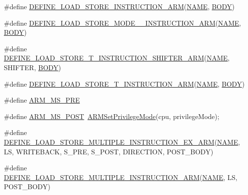 \begin{DoxyCompactItemize}
\item 
\#define \mbox{\hyperlink{isa-arm_8c_a9ed757c169152fcb203fba1b85c7860a}{D\+E\+F\+I\+N\+E\+\_\+\+L\+O\+A\+D\+\_\+\+S\+T\+O\+R\+E\+\_\+\+I\+N\+S\+T\+R\+U\+C\+T\+I\+O\+N\+\_\+\+A\+RM}}(\mbox{\hyperlink{inflate_8h_a164ea0159d5f0b5f12a646f25f99eceaa67bc2ced260a8e43805d2480a785d312}{N\+A\+ME}},  \mbox{\hyperlink{gzlog_8c_aa6bdf6a6d9916c343e1e17774d84a156}{B\+O\+DY}})
\item 
\#define \mbox{\hyperlink{isa-arm_8c_a2ba94fb699e9f4428e6cf1d640f42c2a}{D\+E\+F\+I\+N\+E\+\_\+\+L\+O\+A\+D\+\_\+\+S\+T\+O\+R\+E\+\_\+\+M\+O\+D\+E\+\_\+\_\+\+I\+N\+S\+T\+R\+U\+C\+T\+I\+O\+N\+\_\+\+A\+RM}}(\mbox{\hyperlink{inflate_8h_a164ea0159d5f0b5f12a646f25f99eceaa67bc2ced260a8e43805d2480a785d312}{N\+A\+ME}},  \mbox{\hyperlink{gzlog_8c_aa6bdf6a6d9916c343e1e17774d84a156}{B\+O\+DY}})
\item 
\#define \mbox{\hyperlink{isa-arm_8c_a735d8637e51804e2c8b174f9edc43e04}{D\+E\+F\+I\+N\+E\+\_\+\+L\+O\+A\+D\+\_\+\+S\+T\+O\+R\+E\+\_\+\+T\+\_\+\+I\+N\+S\+T\+R\+U\+C\+T\+I\+O\+N\+\_\+\+S\+H\+I\+F\+T\+E\+R\+\_\+\+A\+RM}}(\mbox{\hyperlink{inflate_8h_a164ea0159d5f0b5f12a646f25f99eceaa67bc2ced260a8e43805d2480a785d312}{N\+A\+ME}},  S\+H\+I\+F\+T\+ER,  \mbox{\hyperlink{gzlog_8c_aa6bdf6a6d9916c343e1e17774d84a156}{B\+O\+DY}})
\item 
\#define \mbox{\hyperlink{isa-arm_8c_ada2566a0e14f1bde045017588e6fe1e7}{D\+E\+F\+I\+N\+E\+\_\+\+L\+O\+A\+D\+\_\+\+S\+T\+O\+R\+E\+\_\+\+T\+\_\+\+I\+N\+S\+T\+R\+U\+C\+T\+I\+O\+N\+\_\+\+A\+RM}}(\mbox{\hyperlink{inflate_8h_a164ea0159d5f0b5f12a646f25f99eceaa67bc2ced260a8e43805d2480a785d312}{N\+A\+ME}},  \mbox{\hyperlink{gzlog_8c_aa6bdf6a6d9916c343e1e17774d84a156}{B\+O\+DY}})
\item 
\#define \mbox{\hyperlink{isa-arm_8c_ab421d83d04b870edf4883223176566b9}{A\+R\+M\+\_\+\+M\+S\+\_\+\+P\+RE}}
\item 
\#define \mbox{\hyperlink{isa-arm_8c_a96d347cafe10b558e730777641cab389}{A\+R\+M\+\_\+\+M\+S\+\_\+\+P\+O\+ST}}~\mbox{\hyperlink{isa-arm_8c_ac85f42234737e9423c66613a87824701}{A\+R\+M\+Set\+Privilege\+Mode}}(cpu, privilege\+Mode);
\item 
\#define \mbox{\hyperlink{isa-arm_8c_a29008e696fccc7169c2f74f616735efe}{D\+E\+F\+I\+N\+E\+\_\+\+L\+O\+A\+D\+\_\+\+S\+T\+O\+R\+E\+\_\+\+M\+U\+L\+T\+I\+P\+L\+E\+\_\+\+I\+N\+S\+T\+R\+U\+C\+T\+I\+O\+N\+\_\+\+E\+X\+\_\+\+A\+RM}}(\mbox{\hyperlink{inflate_8h_a164ea0159d5f0b5f12a646f25f99eceaa67bc2ced260a8e43805d2480a785d312}{N\+A\+ME}},  LS,  W\+R\+I\+T\+E\+B\+A\+CK,  S\+\_\+\+P\+RE,  S\+\_\+\+P\+O\+ST,  D\+I\+R\+E\+C\+T\+I\+ON,  P\+O\+S\+T\+\_\+\+B\+O\+DY)
\item 
\#define \mbox{\hyperlink{isa-arm_8c_a7b4adc68a678b215df70ac335245adca}{D\+E\+F\+I\+N\+E\+\_\+\+L\+O\+A\+D\+\_\+\+S\+T\+O\+R\+E\+\_\+\+M\+U\+L\+T\+I\+P\+L\+E\+\_\+\+I\+N\+S\+T\+R\+U\+C\+T\+I\+O\+N\+\_\+\+A\+RM}}(\mbox{\hyperlink{inflate_8h_a164ea0159d5f0b5f12a646f25f99eceaa67bc2ced260a8e43805d2480a785d312}{N\+A\+ME}},  LS,  P\+O\+S\+T\+\_\+\+B\+O\+DY)
\end{DoxyCompactItemize}
